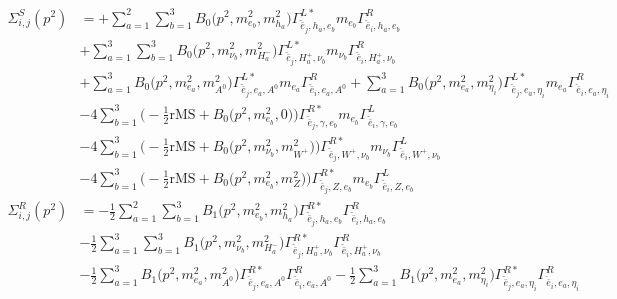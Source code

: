 \begin{itemize}
\begin{align} 
\Sigma^S_{i,j}(p^2) &= +\sum_{a=1}^{2}\sum_{b=1}^{3}{B_0\Big(p^{2},m^2_{e_{{b}}},m^2_{h_{{a}}}\Big)} {\Gamma^{L*}_{\check{\bar{e}}_{{j}},h_{{a}},e_{{b}}}} m_{e_{{b}}} {\Gamma^R_{\check{\bar{e}}_{{i}},h_{{a}},e_{{b}}}} \nonumber \\ 
 &+\sum_{a=1}^{3}\sum_{b=1}^{3}{B_0\Big(p^{2},m^2_{\nu_{{b}}},m^2_{H^-_{{a}}}\Big)} {\Gamma^{L*}_{\check{\bar{e}}_{{j}},H^+_{{a}},\nu_{{b}}}} m_{\nu_{{b}}} {\Gamma^R_{\check{\bar{e}}_{{i}},H^+_{{a}},\nu_{{b}}}} \nonumber \\ 
 &+\sum_{a=1}^{3}{B_0\Big(p^{2},m^2_{e_{{a}}},m^2_{A^0}\Big)} {\Gamma^{L*}_{\check{\bar{e}}_{{j}},e_{{a}},A^0}} m_{e_{{a}}} {\Gamma^R_{\check{\bar{e}}_{{i}},e_{{a}},A^0}} +\sum_{a=1}^{3}{B_0\Big(p^{2},m^2_{e_{{a}}},m^2_{\eta_i}\Big)} {\Gamma^{L*}_{\check{\bar{e}}_{{j}},e_{{a}},\eta_i}} m_{e_{{a}}} {\Gamma^R_{\check{\bar{e}}_{{i}},e_{{a}},\eta_i}} \nonumber \\ 
 &-4 \sum_{b=1}^{3}\Big(-\frac{1}{2} \text{rMS}  + {B_0\Big(p^{2},m^2_{e_{{b}}},0\Big)}\Big){\Gamma^{R*}_{\check{\bar{e}}_{{j}},\gamma,e_{{b}}}} m_{e_{{b}}} {\Gamma^L_{\check{\bar{e}}_{{i}},\gamma,e_{{b}}}}  \nonumber \\ 
 &-4 \sum_{b=1}^{3}\Big(-\frac{1}{2} \text{rMS}  + {B_0\Big(p^{2},m^2_{\nu_{{b}}},m^2_{W^+}\Big)}\Big){\Gamma^{R*}_{\check{\bar{e}}_{{j}},W^+,\nu_{{b}}}} m_{\nu_{{b}}} {\Gamma^L_{\check{\bar{e}}_{{i}},W^+,\nu_{{b}}}}  \nonumber \\ 
 &-4 \sum_{b=1}^{3}\Big(-\frac{1}{2} \text{rMS}  + {B_0\Big(p^{2},m^2_{e_{{b}}},m^2_{Z}\Big)}\Big){\Gamma^{R*}_{\check{\bar{e}}_{{j}},Z,e_{{b}}}} m_{e_{{b}}} {\Gamma^L_{\check{\bar{e}}_{{i}},Z,e_{{b}}}}  \\ 
\Sigma^R_{i,j}(p^2) &= -\frac{1}{2} \sum_{a=1}^{2}\sum_{b=1}^{3}{B_1\Big(p^{2},m^2_{e_{{b}}},m^2_{h_{{a}}}\Big)} {\Gamma^{R*}_{\check{\bar{e}}_{{j}},h_{{a}},e_{{b}}}} {\Gamma^R_{\check{\bar{e}}_{{i}},h_{{a}},e_{{b}}}}  \nonumber \\ 
 &-\frac{1}{2} \sum_{a=1}^{3}\sum_{b=1}^{3}{B_1\Big(p^{2},m^2_{\nu_{{b}}},m^2_{H^-_{{a}}}\Big)} {\Gamma^{R*}_{\check{\bar{e}}_{{j}},H^+_{{a}},\nu_{{b}}}} {\Gamma^R_{\check{\bar{e}}_{{i}},H^+_{{a}},\nu_{{b}}}}  \nonumber \\ 
 &-\frac{1}{2} \sum_{a=1}^{3}{B_1\Big(p^{2},m^2_{e_{{a}}},m^2_{A^0}\Big)} {\Gamma^{R*}_{\check{\bar{e}}_{{j}},e_{{a}},A^0}} {\Gamma^R_{\check{\bar{e}}_{{i}},e_{{a}},A^0}}  -\frac{1}{2} \sum_{a=1}^{3}{B_1\Big(p^{2},m^2_{e_{{a}}},m^2_{\eta_i}\Big)} {\Gamma^{R*}_{\check{\bar{e}}_{{j}},e_{{a}},\eta_i}} {\Gamma^R_{\check{\bar{e}}_{{i}},e_{{a}},\eta_i}}  \nonumber \\ 

\end{align}
\end{itemize}
